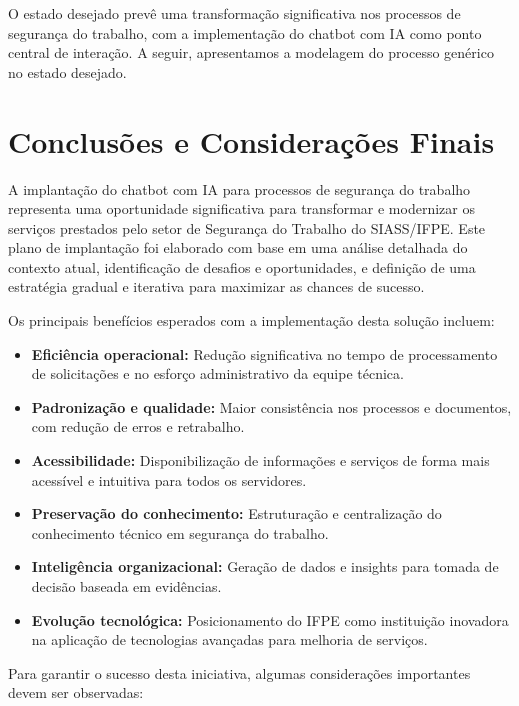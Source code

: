\documentclass[12pt,a4paper]{article}
\begin{document}
O estado desejado prevê uma transformação significativa nos processos de segurança do trabalho, com a implementação do chatbot com IA como ponto central de interação. A seguir, apresentamos a modelagem do processo genérico no estado desejado.

\section{Conclusões e Considerações Finais}

A implantação do chatbot com IA para processos de segurança do trabalho representa uma oportunidade significativa para transformar e modernizar os serviços prestados pelo setor de Segurança do Trabalho do SIASS/IFPE. Este plano de implantação foi elaborado com base em uma análise detalhada do contexto atual, identificação de desafios e oportunidades, e definição de uma estratégia gradual e iterativa para maximizar as chances de sucesso.

Os principais benefícios esperados com a implementação desta solução incluem:

\begin{itemize}
    \item \textbf{Eficiência operacional:} Redução significativa no tempo de processamento de solicitações e no esforço administrativo da equipe técnica.
    
    \item \textbf{Padronização e qualidade:} Maior consistência nos processos e documentos, com redução de erros e retrabalho.
    
    \item \textbf{Acessibilidade:} Disponibilização de informações e serviços de forma mais acessível e intuitiva para todos os servidores.
    
    \item \textbf{Preservação do conhecimento:} Estruturação e centralização do conhecimento técnico em segurança do trabalho.
    
    \item \textbf{Inteligência organizacional:} Geração de dados e insights para tomada de decisão baseada em evidências.
    
    \item \textbf{Evolução tecnológica:} Posicionamento do IFPE como instituição inovadora na aplicação de tecnologias avançadas para melhoria de serviços.
\end{itemize}

Para garantir o sucesso desta iniciativa, algumas considerações importantes devem ser observadas:
\end{document}
